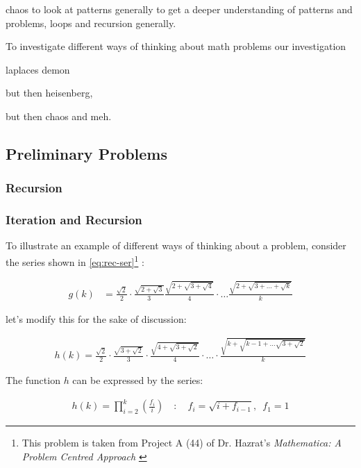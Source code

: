 \documentclass[11pt]{article}
\begin{document}
chaos to look at patterns generally to get a deeper understanding of patterns
and problems, loops and recursion generally.

To investigate different ways of thinking about math problems our investigation

laplaces demon

but then heisenberg,

but then chaos and meh.

\subsection{Preliminary Problems}
\label{sec:orgb81d2d2}
\subsubsection{Recursion}
\label{sec:orga2939f7}
\subsubsection{Iteration and Recursion}
\label{series-and-recursion}
To illustrate an example of different ways of thinking about a problem, consider the series shown in \eqref{eq:rec-ser}\footnote{This problem is taken from Project A (44) of Dr. Hazrat's \emph{Mathematica: A Problem Centred Approach} \cite{hazratMathematicaProblemCenteredApproach2015}} :

\begin{align}
    g\left( k \right) &=  \frac{\sqrt{2} }{2} \cdot   \frac{\sqrt{2+  \sqrt{3}}  }{3} \frac{\sqrt{2 +  \sqrt{3 +  \sqrt{4} } } }{4} \cdot  \ldots \frac{\sqrt{2 +  \sqrt{3 +  \ldots +  \sqrt{k} } } }{k} \label{eq:rec-ser}
\end{align}

let's modify this for the sake of discussion:

\begin{align}
h\left( k \right) = \frac{\sqrt{2}  }{2} \cdot  \frac{\sqrt{3 +  \sqrt{2} } }{3} \cdot  \frac{\sqrt{4 +  \sqrt{3 +  \sqrt{2} } } }{4} \cdot  \ldots \cdot  \frac{\sqrt{k +  \sqrt{k - 1 +  \ldots \sqrt{3 + \sqrt{2}  } } } }{k} \label{eq:rec-ser-mod}
\end{align}

The function \(h\) can be expressed by the series:

$$\begin{aligned}
h\left( k \right) = \prod^k_{i = 2} \left( \frac{f_i}{i}  \right)  \quad : \quad f_i = \sqrt{i +  f_{i - 1}}, \enspace f_{1} = 1
\end{aligned}$$
\end{document}

